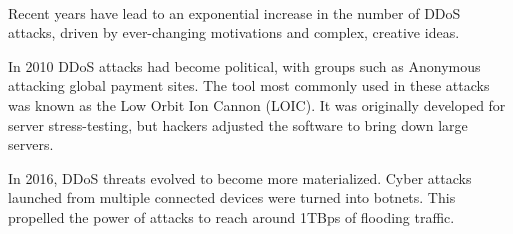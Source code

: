 Recent years have lead to an exponential increase\textsuperscript{\cite{ddosincapsula}} in the number of DDoS attacks, driven by ever-changing motivations and complex, creative ideas.

\vspace{0.5cm}

In 2010 DDoS attacks had become political, with groups such as Anonymous attacking global payment sites. The tool most commonly used in these attacks was known as the Low Orbit Ion Cannon (LOIC). It was originally developed for server stress-testing, but hackers adjusted the software to bring down large servers.

In 2016, DDoS threats evolved to become more materialized. Cyber attacks launched from multiple connected devices were turned into botnets. This propelled the power of attacks to reach around 1TBps of flooding traffic.